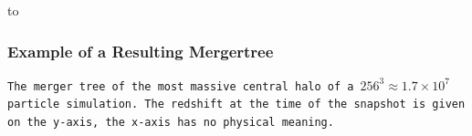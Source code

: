 %    



{
    {\vbox to }
    \begin{frame}
        \frametitle{Example of a Resulting Mergertree}
        \vspace{6cm}
        \small\texttt{The merger tree of the most massive central halo of a $256^3 \approx 1.7\times 10^7$ particle simulation. 
            The redshift at the time of the snapshot is given on the y-axis, the x-axis has no physical meaning.
        }
    \end{frame}
}



